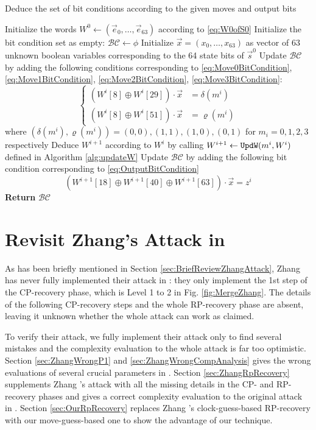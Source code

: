 \begin{algorithm}[htbp]
	\caption{Deduce the set of bit conditions according to the given moves and output bits} \label{alg:getBC}
	\begin{algorithmic}[1]
\State Initialize the words $W^0\leftarrow (\vec e_0,\ldots, \vec e_{63})$ according to \eqref{eq:W0ofS0}
\State Initialize the bit condition set as empty: $\mathcal{BC}\leftarrow \phi$
\State Initialize $\vec{x}=(x_0,\ldots, x_{63})$ as vector of 63 unknown boolean variables corresponding to the 64 state bits of $\vec s^0$
\State Update $\mathcal{BC}$ by adding the following conditions corresponding to \eqref{eq:Move0BitCondition}, \eqref{eq:Move1BitCondition}, \eqref{eq:Move2BitCondition}, \eqref{eq:Move3BitCondition}:
\[
\left\{
\begin{aligned}
(W^i[8]\oplus W^i[29])\cdot \vec x&=\delta(m^i)\\
(W^i[8]\oplus W^i[51])\cdot \vec x&=\varrho(m^i)
\end{aligned}
\right.
\]
where $(\delta(m^i), \varrho(m^i))=(0,0),(1,1),(1,0),(0,1)$ for $m_i=0,1,2,3$ respectively
\EndIf
\State Deduce $W^{i+1}$ according to $W^{i}$ by calling $W^{i+1}\leftarrow {\tt UpdW}(m^i,W^i)$ defined in Algorithm \ref{alg:updateW}
\State Update $\mathcal{BC}$ by adding the following bit condition corresponding to \eqref{eq:OutputBitCondition}
\[
(W^{i+1}[18]\oplus W^{i+1}[40]\oplus W^{i+1}[63])\cdot \vec x =z^i
\]
\EndFor
\State \textbf{Return} $\mathcal{BC}$
		\EndProcedure
	\end{algorithmic}
\end{algorithm}


\section{Revisit Zhang's Attack in \cite{AC:Zhang19}}
As has been briefly mentioned in Section \ref{sec:BriefReviewZhangAttack}, Zhang \etal has never fully implemented their attack in \cite{AC:Zhang19}: 
they only implement the 1st step of the CP-recovery phase, which is Level 1 to 2 in Fig. \ref{fig:MergeZhang}. 
The details of the following CP-recovery steps and the whole RP-recovery phase are absent, leaving it unknown whether the whole attack can work as claimed. 

To verify their attack, we fully implement their attack only to find several mistakes and the complexity evaluation to the whole attack is far too optimistic. 
Section \ref{sec:ZhangWrongP1} and \ref{sec:ZhangWrongCompAnalysis} gives the wrong evaluations of several crucial parameters in \cite{AC:Zhang19}. 
Section \ref{sec:ZhangRpRecovery} supplements Zhang \etal's attack with all the missing details in the CP- and RP-recovery phases and gives a correct complexity evaluation to the original attack in \cite{AC:Zhang19}. 
Section \ref{sec:OurRpRecovery} replaces Zhang \etal's clock-guess-based RP-recovery with our move-guess-based one to show the advantage of our technique.

